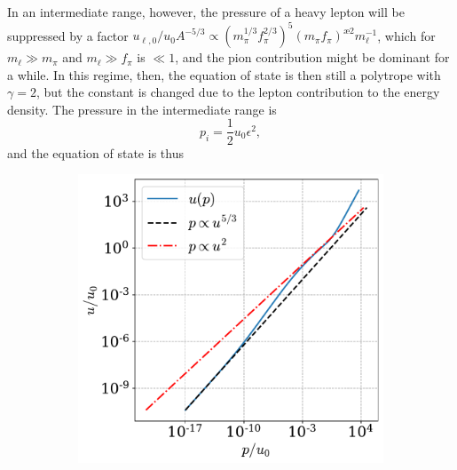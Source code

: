 In an intermediate range, however, the pressure of a heavy lepton will be suppressed by a factor $u_{\ell,0}/ u_0 A^{-5/3}\propto (m_\pi^{1/3} f_\pi^{{2}/{3}})^5 (m_\pi f_\pi)^{æ2} m_\ell^{-1}$, which for $m_\ell \gg m_\pi$ and $m_\ell \gg f_\pi$ is $\ll 1$, and the pion contribution might be dominant for a while.
In this regime, then, the equation of state is then still a polytrope with $\gamma = 2$, but the constant is changed due to the lepton contribution to the energy density.
The pressure in the intermediate range is
%
\begin{equation}
    p_i = \frac{1}{2} u_0 \epsilon^2,
\end{equation}
%
and the equation of state is thus
%
\begin{figure}[!htb]
    \centering
    \begin{subfigure}{0.49\textwidth}
        \includegraphics[width=\textwidth]{../scripts/figurer/charge_neutrality/eos_lepton_limitse.pdf}
    \end{subfigure}
    \begin{subfigure}{0.49\textwidth}

\end{subfigure}
\end{figure}

